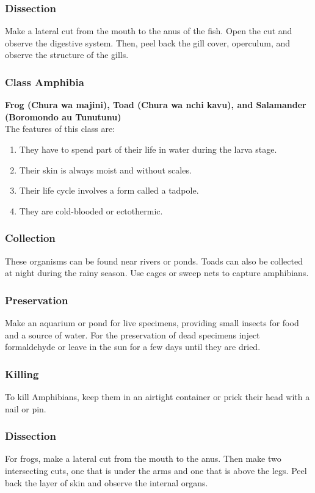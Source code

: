 \subsubsection{Dissection}
Make a lateral cut from the mouth to the anus of the fish. Open the cut and observe the digestive system. Then, peel back the gill cover, operculum, and observe the structure of the gills.

\subsubsection{Class Amphibia}
\textbf{Frog (Chura wa majini), Toad (Chura wa nchi kavu), and Salamander (Boromondo au Tunutunu)}\\The features of this class are:
\begin{enumerate}
\item{They have to spend part of their life in water during the larva stage.}
\item{Their skin is always moist and without scales.}
\item{Their life cycle involves a form called a tadpole.}
\item{They are cold-blooded or ectothermic.}
\end{enumerate}

\subsubsection{Collection}
These organisms can be found near rivers or ponds. Toads can also be collected at night during the rainy season. Use cages or sweep nets to capture amphibians.

\subsubsection{Preservation} 
Make an aquarium or pond for live specimens, providing small insects for food and a source of water. For the preservation of dead specimens inject formaldehyde or leave in the sun for a few days until they are dried.

\subsubsection{Killing}
To kill Amphibians, keep them in an airtight container or prick their head with a nail or pin.

\subsubsection{Dissection}
For frogs, make a lateral cut from the mouth to the anus. Then make two intersecting cuts, one that is under the arms and one that is above the legs. Peel back the layer of skin and observe the internal organs.

